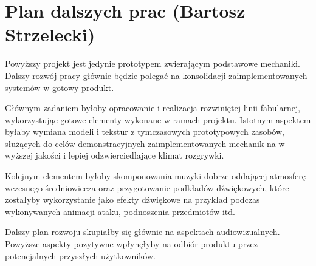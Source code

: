 \section{Plan dalszych prac (Bartosz Strzelecki)}
Powyższy projekt jest jedynie prototypem zwierającym podstawowe mechaniki.
Dalszy rozwój pracy głównie będzie polegać na konsolidacji zaimplementowanych
systemów w gotowy produkt.

Głównym zadaniem byłoby opracowanie i realizacja rozwiniętej linii fabularnej,
wykorzystując gotowe elementy wykonane w ramach projektu. Istotnym aspektem
byłaby wymiana  modeli i tekstur z tymczasowych prototypowych zasobów, służących
do celów demonstracyjnych zaimplementowanych mechanik na w wyższej jakości
i lepiej odzwierciedlające klimat rozgrywki.

Kolejnym elementem byłoby skomponowania muzyki dobrze oddającej atmosferę wczesnego
średniowiecza oraz przygotowanie podkładów dźwiękowych, które zostałyby wykorzystanie
jako efekty dźwiękowe na przykład podczas wykonywanych animacji ataku, podnoszenia przedmiotów itd.

Dalszy plan rozwoju skupiałby się głównie na aspektach audiowizualnych.
Powyższe aspekty pozytywne wpłynęłyby na odbiór produktu przez potencjalnych przyszłych
użytkowników. 
